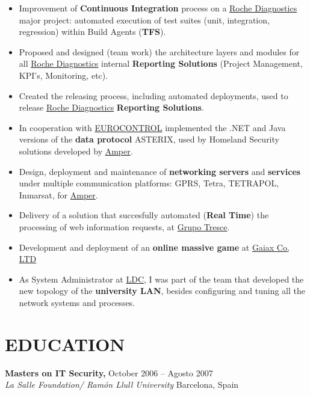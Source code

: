 \documentclass[line,margin]{res}
\begin{document}
\begin{resume}
\begin{itemize}
                \item Improvement of \textbf{Continuous Integration} process on a 
                \href{http://www.roche.com}{Roche Diagnostics} major project: automated execution of test suites (unit, integration, regression) within Build Agents (\textbf{TFS}).
                \item Proposed and designed (team work) the architecture layers and modules for 
                all \href{http://www.roche.com}{Roche Diagnostics} internal \textbf{Reporting Solutions}
                (Project Management, KPI's, Monitoring, etc).
                \item Created the releasing process, including automated deployments, used to release \href{http://www.roche.com}{Roche Diagnostics} \textbf{Reporting Solutions}.
                \item In cooperation with \href{www.eurocontrol.int}{EUROCONTROL} 
                implemented the .NET and Java versions of the \textbf{data protocol} ASTERIX, used 
                by Homeland Security solutions developed by \href{http://www.amper.es}{Amper}.                             
                \item Design, deployment and maintenance of \textbf{networking servers} and 
                \textbf{services} under multiple communication platforms: GPRS, Tetra, 
                TETRAPOL, Inmarsat, for \href{http://www.amper.es}{Amper}.
                \item Delivery of a solution that succesfully automated (\textbf{Real Time})
                the processing of web information requests, at \href{http://www.tresce.com}{Grupo Tresce}.                
                \item Development and deployment of an \textbf{online massive game} at \href{http://www.gaiax.co.jp}{Gaiax Co, LTD}
                \item As System Administrator at \href{http://www.ldc.usb.ve}{LDC}, I was part of the team that 
                developed the new topology of the \textbf{university LAN}, besides configuring
                and tuning all the network systems and processes.
                \end{itemize}

\section{EDUCATION}
               \textbf{Masters on IT Security,} \hfill October 2006 -- Agosto 2007 \\
               \textit{La Salle Foundation/ Ram\'{o}n Llull University} 
               \hfill Barcelona, Spain


\end{resume}
\end{document}
